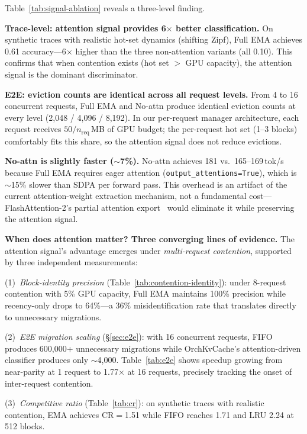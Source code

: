 \documentclass[conference]{IEEEtran}
\begin{document}
Table~\ref{tab:signal-ablation} reveals a three-level finding.

\textbf{Trace-level: attention signal provides 6$\times$ better classification.} On synthetic traces with realistic hot-set dynamics (shifting Zipf), Full EMA achieves 0.61 accuracy---6$\times$ higher than the three non-attention variants (all 0.10). This confirms that when contention exists (hot set $>$ GPU capacity), the attention signal is the dominant discriminator.

\textbf{E2E: eviction counts are identical across all request levels.} From 4 to 16 concurrent requests, Full EMA and No-attn produce identical eviction counts at every level (2,048 / 4,096 / 8,192). In our per-request manager architecture, each request receives $50/n_\text{req}$\,MB of GPU budget; the per-request hot set (1--3 blocks) comfortably fits this share, so the attention signal does not reduce evictions.

\textbf{No-attn is slightly faster ($\boldsymbol{\sim}$7\%).} No-attn achieves 181 vs.\ 165--169\,tok/s because Full EMA requires eager attention (\texttt{output\_attentions=True}), which is ${\sim}$15\% slower than SDPA per forward pass. This overhead is an artifact of the current attention-weight extraction mechanism, not a fundamental cost---FlashAttention-2's partial attention export~\cite{flashattn2} would eliminate it while preserving the attention signal.

\textbf{When does attention matter? Three converging lines of evidence.} The attention signal's advantage emerges under \emph{multi-request contention}, supported by three independent measurements:

(1)~\emph{Block-identity precision} (Table~\ref{tab:contention-identity}): under 8-request contention with 5\% GPU capacity, Full EMA maintains 100\% precision while recency-only drops to 64\%---a 36\% misidentification rate that translates directly to unnecessary migrations.

(2)~\emph{E2E migration scaling} (\S\ref{sec:e2e}): with 16 concurrent requests, FIFO produces 600,000+ unnecessary migrations while OrchKvCache's attention-driven classifier produces only ${\sim}$4,000. Table~\ref{tab:e2e} shows speedup growing from near-parity at 1 request to 1.77$\times$ at 16 requests, precisely tracking the onset of inter-request contention.

(3)~\emph{Competitive ratio} (Table~\ref{tab:cr}): on synthetic traces with realistic contention, EMA achieves CR$=$1.51 while FIFO reaches 1.71 and LRU 2.24 at 512 blocks.
\end{document}
